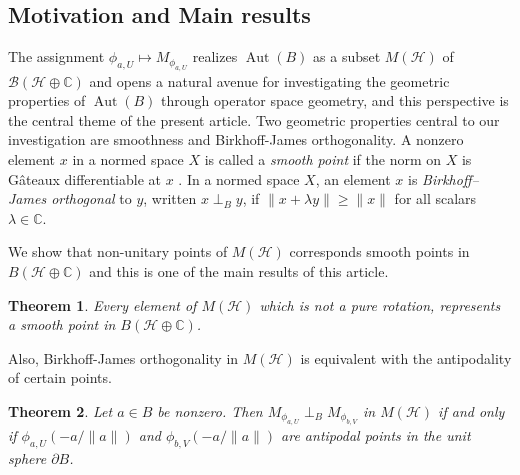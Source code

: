 \documentclass[12pt]{amsart}
\newtheorem{theorem}{Theorem}[section]
\theoremstyle{definition}
\newcommand{\B}{\mathcal{B}}
\renewcommand{\H}{\mathcal{H}}
\newcommand{\Aut}{\operatorname{Aut}}
\begin{document}
\subsection{Motivation and Main results} The assignment $\phi_{a,U} \mapsto M_{\phi_{a,U}}$ realizes $\Aut(B)$ as a subset $M(\H)$ of $\B(\mathcal{H} \oplus \mathbb{C})$ and opens a natural avenue for investigating the geometric properties of $\Aut(B)$ through operator space geometry, and this perspective is the central theme of the present article. Two geometric properties central to our investigation are smoothness and Birkhoff-James orthogonality. A nonzero element $x$ in a normed space $X$ is called a \emph{smooth point} if the norm on $X$ is G\^{a}teaux differentiable at $x$ \cite{James2, Roy-2024}. In a normed space $X$, an element $x$ is \emph{Birkhoff--James orthogonal} to $y$, written $x \perp_B y$, if $\|x + \lambda y\| \geq \|x\|$ for all scalars $\lambda \in \mathbb{C}$. 


\medskip


\noindent We show that non-unitary points of $M \left(\H \right)$ corresponds smooth points in $B \left(\H\oplus \mathbb{C} \right)$ and this is one of the main results of this article.

\begin{theorem}\label{smooth: Aut}
Every element of $M \left(\H \right)$ which is not a pure rotation, represents a smooth point in $B \left(\H\oplus \mathbb{C} \right)$. 
\end{theorem}

\noindent Also, Birkhoff-James orthogonality in $M \left(\H \right)$ is equivalent with the antipodality of certain points.

\begin{theorem}\label{ortho: aut}
Let $a\in B$ be nonzero. Then $M_{\phi_{a,U}}\perp_B M_{\phi_{b,V}}$ in $M \left(\H \right)$ if and only if $\phi_{a,U} \left(-a/\|a\| \right)$ and $\phi_{b,V} \left(-a/\|a\| \right)$ are antipodal points in the unit sphere $\partial B$.
\end{theorem}
\end{document}
